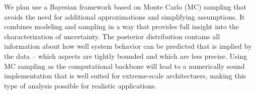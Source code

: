 \documentclass[11pt]{article}
\begin{document}
We plan use a Bayesian framework based on Monte Carlo (MC) sampling that
avoids the need for additional approximations and simplifying assumptions.
It combines modeling and sampling in a way that provides full insight into the characterization
of uncertainty.
The posterior distribution contains all information about how well system behavior
can be predicted that is implied
by the data -- which aspects are tightly bounded and which are less precise.
Using MC sampling as the computational backbone will lead to a numerically sound
implementation
that is well suited for extreme-scale architectuers,
making this type of analysis possible for realistic applications.
\end{document}
